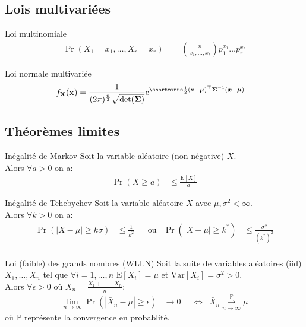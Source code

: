 \documentclass[10pt, french]{article}
\begin{document}
\begin{multicols*}{2}
\subsection*{Lois multivariées}
	
\begin{rappel}{Loi multinomiale}
\begin{align*}
	\Pr(X_{1} = x_{1}, \dots, X_{r} = x_{r})
		&=	\binom{n}{x_{1}, \dots, x_{r}} p_{1}^{x_{1}} \dots p_{r}^{x_{r}}
\end{align*}
\end{rappel}

\begin{rappel}{Loi normale multivariée}
\begin{align*}
	f_{\matr{X}}(\matr{x}) 
		&= 	\frac{1}{(2 \pi)^{\frac{n}{2}} \sqrt{\text{det}(\bm{\Sigma})}} \e{\shortminus \frac{1}{2} (\matr{x} - \bm{\mu})^{\top} \bm{\Sigma}^{-1}(\bm{x} - \bm{\mu})}
\end{align*}
\end{rappel}

\columnbreak

\subsection*{Théorèmes limites}

\begin{algo}{Inégalité de Markov}
Soit la variable aléatoire (non-négative) $X$.\\
Alors $\forall a > 0$ on a:
\begin{align*}
	\Pr(X \ge a) 
	&\le 	\frac{\text{E}[X]}{a}
\end{align*}
\end{algo}

\begin{algo}{Inégalité de Tchebychev}
Soit la variable aléatoire $X$ avec $\mu, \sigma^{2} < \infty$.\\
Alors $\forall k > 0$ on a:
\begin{align*}
	\Pr\left( \left|X - \mu\right| \ge k \sigma\right)
	&\le 	\frac{1}{k^{2}}	&
	&\text{ou}	&
	\Pr\left( \left|X - \mu\right| \ge k^{*}\right)
	&\le 	\frac{\sigma^{2}}{(k^{*})^{2}}	\\
\end{align*}
\end{algo}

\begin{algo}{Loi (faible) des grands nombres (WLLN)}
Soit la suite de variables aléatoires (iid) $X_{1}, \dots, X_{n}$ tel que $\forall i = 1, \dots, n$ $\text{E}[X_{i}] = \mu$ et $\text{Var}[X_{i}] = \sigma^{2} > 0$.\\
Alors $\forall\epsilon > 0$ où $\bar{X}_{n} = \frac{X_{1} + \dots + X_{n}}{n}$:
\begin{align*} 
	\underset{n \rightarrow \infty}{\lim} \Pr\left( \left| \bar{X}_{n} -\mu \right| \ge \epsilon \right) 
	&\rightarrow		0	&
	&\Leftrightarrow	&
	\bar{X}_{n} \overset{\mathds{P}}{\underset{n \rightarrow \infty}{\longrightarrow}} \mu
\end{align*}
où $\mathds{P}$ représente la convergence en probablité.
\end{algo}


\end{multicols*}
\end{document}
